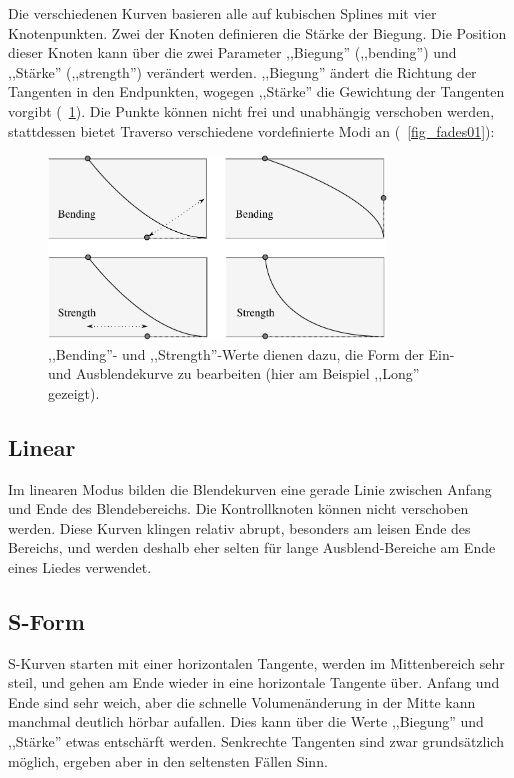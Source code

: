 Die verschiedenen Kurven basieren alle auf kubischen Splines mit vier Knotenpunkten. Zwei der Knoten definieren die Stärke der Biegung. Die Position dieser Knoten kann über die zwei Parameter ,,Biegung'' (,,bending'') und ,,Stärke'' (,,strength'') verändert werden. ,,Biegung'' ändert die Richtung der Tangenten in den Endpunkten, wogegen ,,Stärke'' die Gewichtung der Tangenten vorgibt (\FigB~\ref{fig_fades02}). Die Punkte können nicht frei und unabhängig verschoben werden, stattdessen bietet Traverso verschiedene vordefinierte Modi an (\FigB~\ref{fig_fades01}):

\begin{figure}[t]
 \centering\includegraphics[width=0.8\textwidth]{../images/fades2}
 \caption{,,Bending''- und ,,Strength''-Werte dienen dazu, die Form der Ein- und Ausblendekurve zu bearbeiten (hier am Beispiel ,,Long'' gezeigt).}
 \label{fig_fades02}
\end{figure}

\subsection{Linear}
Im linearen Modus bilden die Blendekurven eine gerade Linie zwischen Anfang und Ende des Blendebereichs. Die Kontrollknoten können nicht verschoben werden. Diese Kurven klingen relativ abrupt, besonders am leisen Ende des Bereichs, und werden deshalb eher selten für lange Ausblend-Bereiche am Ende eines Liedes verwendet.

\subsection{S-Form}
S-Kurven starten mit einer horizontalen Tangente, werden im Mittenbereich sehr steil, und gehen am Ende wieder in eine horizontale Tangente über. Anfang und Ende sind sehr weich, aber die schnelle Volumenänderung in der Mitte kann manchmal deutlich hörbar aufallen. Dies kann über die Werte ,,Biegung'' und ,,Stärke'' etwas entschärft werden. Senkrechte Tangenten sind zwar grundsätzlich möglich, ergeben aber in den seltensten Fällen Sinn.

